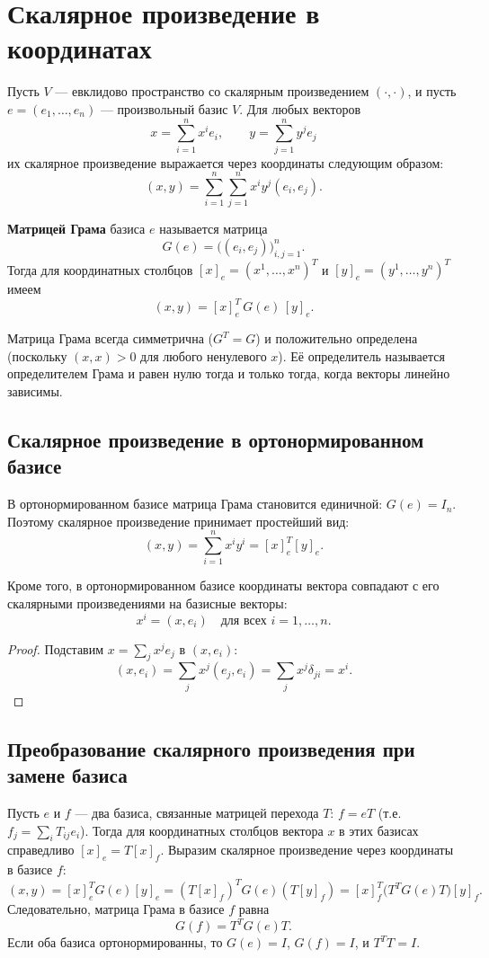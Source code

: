 \documentclass[10pt]{article}
\begin{document}
\section{Скалярное произведение в координатах}

Пусть $V$ — евклидово пространство со скалярным произведением $(\cdot,\cdot)$, и пусть $e = (e_1,\dots,e_n)$ — произвольный базис $V$. Для любых векторов
\[
x = \sum_{i=1}^n x^i e_i, \qquad y = \sum_{j=1}^n y^j e_j
\]
их скалярное произведение выражается через координаты следующим образом:
\[
(x,y) = \sum_{i=1}^n\sum_{j=1}^n x^i y^j (e_i, e_j).
\]

\begin{definition}
    \textbf{Матрицей Грама} базиса $e$ называется матрица
    \[
    G(e) = \bigl( (e_i, e_j) \bigr)_{i,j=1}^n.
    \]
    Тогда для координатных столбцов $[x]_e = (x^1,\dots,x^n)^T$ и $[y]_e = (y^1,\dots,y^n)^T$ имеем
    \[
    (x,y) = [x]_e^T \, G(e) \, [y]_e.
    \]
\end{definition}

\begin{remark}
    Матрица Грама всегда симметрична ($G^T = G$) и положительно определена (поскольку $(x,x) > 0$ для любого ненулевого $x$). Её определитель называется определителем Грама и равен нулю тогда и только тогда, когда векторы линейно зависимы.
\end{remark}

\subsection{Скалярное произведение в ортонормированном базисе}

В ортонормированном базисе матрица Грама становится единичной: $G(e) = I_n$. Поэтому скалярное произведение принимает простейший вид:
\[
(x,y) = \sum_{i=1}^n x^i y^i = [x]_e^T [y]_e.
\]

Кроме того, в ортонормированном базисе координаты вектора совпадают с его скалярными произведениями на базисные векторы:
\[
x^i = (x, e_i) \quad \text{для всех } i = 1,\dots,n.
\]
\begin{proof}
    Подставим $x = \sum_{j} x^j e_j$ в $(x, e_i)$:
    \[
    (x, e_i) = \sum_{j} x^j (e_j, e_i) = \sum_{j} x^j \delta_{ji} = x^i.
    \]
\end{proof}

\subsection{Преобразование скалярного произведения при замене базиса}

Пусть $e$ и $f$ — два базиса, связанные матрицей перехода $T$: $f = e T$ (т.е. $f_j = \sum_i T_{ij} e_i$). Тогда для координатных столбцов вектора $x$ в этих базисах справедливо $[x]_e = T [x]_f$. Выразим скалярное произведение через координаты в базисе $f$:
\[
(x,y) = [x]_e^T G(e) [y]_e = (T[x]_f)^T G(e) (T[y]_f) = [x]_f^T \bigl( T^T G(e) T \bigr) [y]_f.
\]
Следовательно, матрица Грама в базисе $f$ равна
\[
G(f) = T^T G(e) T.
\]
Если оба базиса ортонормированны, то $G(e)=I$, $G(f)=I$, и $T^T T = I$.
\end{document}
